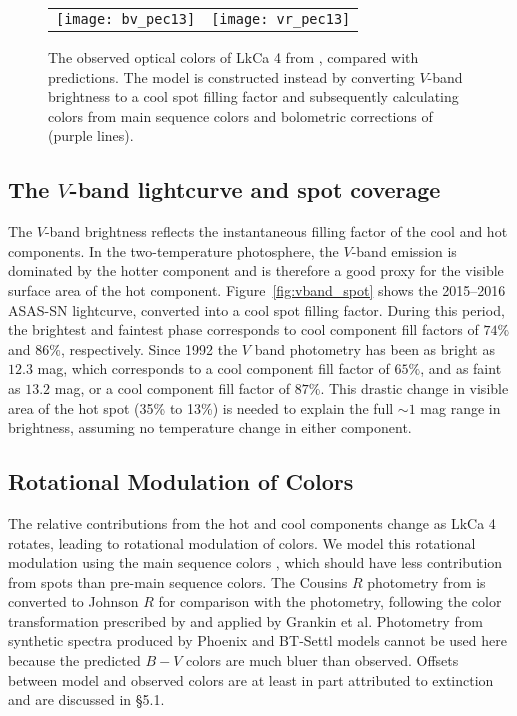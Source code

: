 \documentclass[twocolumn]{emulateapj}%
\begin{document}
\begin{figure*}
 \centering
 \begin{tabular}{ll}
 \texttt{[image: bv\_pec13]} 
    &
   \texttt{[image: vr\_pec13]}
    \end{tabular}
\caption{The observed optical colors of LkCa 4 from \citet{grankin08}, compared with predictions.  The model is constructed instead by converting $V$-band brightness to a cool spot filling factor and subsequently calculating colors from main sequence colors and bolometric corrections of \citet{pecaut13} (purple lines).}
\label{fig:colors}
\end{figure*}


\subsection{The $V$-band lightcurve and spot coverage}\label{sec:rotSpot1}

The  $V$-band brightness reflects the instantaneous filling factor of the cool and hot components.  In the two-temperature photosphere, the $V$-band emission is dominated by the hotter component and is therefore a good proxy for the visible surface area of the hot component.  Figure~\ref{fig:vband_spot} shows the 2015--2016 ASAS-SN lightcurve, converted into a cool spot filling factor.  During this period, the brightest and faintest phase corresponds to cool component fill factors of $74\%$ and $86\%$, respectively.  Since 1992 the $V$ band photometry has been as bright as $12.3$ mag, which corresponds to a cool component fill factor of $65\%$, and as faint as $13.2$ mag, or a cool component fill factor of $87\%$.  This drastic change in visible area of the hot spot (35\% to 13\%) is needed to explain the full $\sim 1$ mag range in brightness, assuming no temperature change in either component.


\subsection{Rotational Modulation of Colors}\label{sec:rotSpot}

The relative contributions from the hot and cool components change as LkCa 4 rotates, leading to rotational modulation of colors.  We model this rotational modulation using the main sequence colors \citep[compiled by][]{pecaut13}, which should have less contribution from spots than  pre-main sequence colors.  The Cousins $R$ photometry from \citet{pecaut13} is converted to Johnson $R$ for comparison with the \citet{grankin08} photometry, following the color transformation prescribed by \citet{landolt83} and applied by Grankin et al.  Photometry from synthetic spectra produced by Phoenix and BT-Settl models cannot be used here because the predicted $B-V$ colors are much bluer than observed.  Offsets between model and observed colors are at least in part attributed to extinction and are discussed in \S 5.1.  
\end{document}
